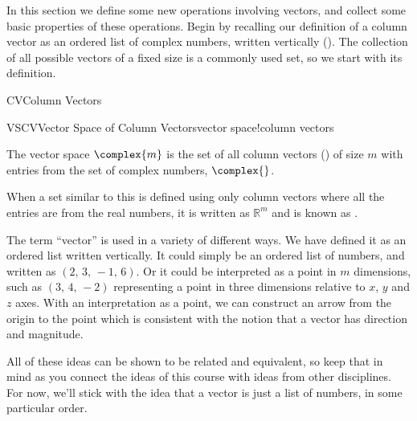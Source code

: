 %
\begin{introduction}
\begin{para}In this section we define some new operations involving vectors, and collect some basic properties of these operations.  Begin by recalling our definition of a column vector as an ordered list of complex numbers, written vertically ().  The collection of all possible vectors of a fixed size is a commonly used set, so we start with its definition.\end{para}
\end{introduction}
%
\begin{subsect}{CV}{Column Vectors}
%
\begin{definition}{VSCV}{Vector Space of Column Vectors}{vector space!column vectors}
\begin{para}The vector space $\complex{m}$ is the set of all column vectors () of size $m$ with entries from the set of complex numbers, $\complex{\null}$.\end{para}
\end{definition}
%
\begin{para}When a set similar to this is defined using only column vectors where all the entries are from the real numbers, it is written as ${\mathbb R}^m$ and is known as .\end{para}
%
\begin{para}The term ``vector'' is used in a variety of different ways.  We have defined it as an ordered list written vertically.  It could simply be an ordered list of numbers, and written as $\left(2,\,3,\,-1,\,6\right)$.  Or it could be interpreted as a point in $m$ dimensions, such as $\left(3,\,4,\,-2\right)$ representing a point in three dimensions relative to $x$, $y$ and $z$ axes.  With an interpretation as a point, we can construct an arrow from the origin to the point which is consistent with the notion that a vector has direction and magnitude.\end{para}
%
\begin{para}All of these ideas can be shown to be related and equivalent, so keep that in mind as you connect the ideas of this course with ideas from other disciplines.  For now, we'll stick with the idea that a vector is just a list of numbers, in some particular order.\end{para}
%
%
\end{subsect}
